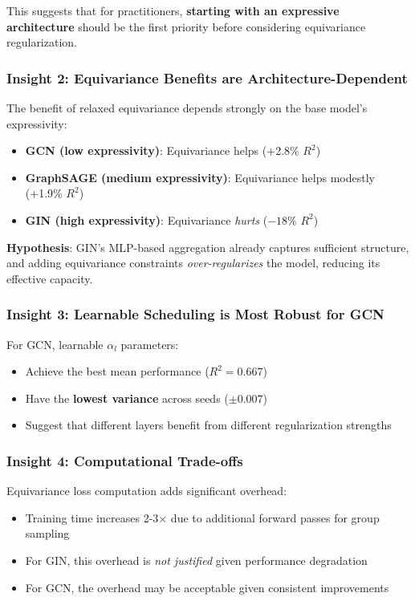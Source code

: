 \documentclass[11pt,a4paper]{article}
\begin{document}
This suggests that for practitioners, \textbf{starting with an expressive architecture} should be the first priority before considering equivariance regularization.

\subsubsection{Insight 2: Equivariance Benefits are Architecture-Dependent}

The benefit of relaxed equivariance depends strongly on the base model's expressivity:

\begin{itemize}
    \item \textbf{GCN (low expressivity)}: Equivariance helps (+2.8\% $R^2$)
    \item \textbf{GraphSAGE (medium expressivity)}: Equivariance helps modestly (+1.9\% $R^2$)
    \item \textbf{GIN (high expressivity)}: Equivariance \textit{hurts} ($-18\%$ $R^2$)
\end{itemize}

\textbf{Hypothesis}: GIN's MLP-based aggregation already captures sufficient structure, and adding equivariance constraints \textit{over-regularizes} the model, reducing its effective capacity.

\subsubsection{Insight 3: Learnable Scheduling is Most Robust for GCN}

For GCN, learnable $\alpha_l$ parameters:
\begin{itemize}
    \item Achieve the best mean performance ($R^2 = 0.667$)
    \item Have the \textbf{lowest variance} across seeds ($\pm 0.007$)
    \item Suggest that different layers benefit from different regularization strengths
\end{itemize}

\subsubsection{Insight 4: Computational Trade-offs}

Equivariance loss computation adds significant overhead:
\begin{itemize}
    \item Training time increases 2-3$\times$ due to additional forward passes for group sampling
    \item For GIN, this overhead is \textit{not justified} given performance degradation
    \item For GCN, the overhead may be acceptable given consistent improvements
\end{itemize}
\end{document}
